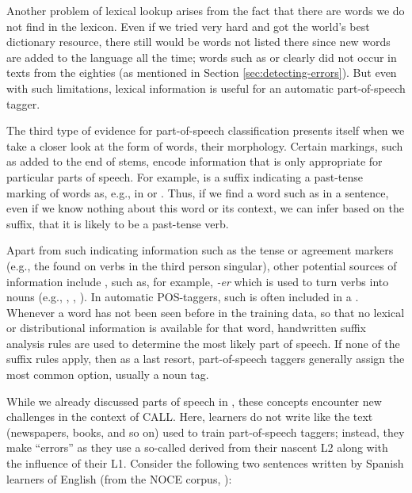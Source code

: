 Another problem of lexical lookup arises from the fact that there are
words we do not find in the lexicon. Even if we tried very hard and
got the world's best dictionary resource, there still would be words
not listed there since new words are added to the language all the
time; words such as  or
 clearly did not occur in texts from the eighties (as mentioned in Section \ref{sec:detecting-errors}). 
But even with such limitations, lexical information is useful for an automatic part-of-speech tagger.


The third type of evidence for part-of-speech classification presents itself when we take a closer look at the form
of words, their morphology.  Certain markings, such as
 added to the end of stems, encode information
that is only appropriate for particular parts of speech. For example,
 is a suffix indicating a past-tense marking of words
as, e.g., in  or . Thus, if we find a
word such as  in a sentence, even if we know
nothing about this word or its context, we can infer based on the
 suffix, that it is likely to be a past-tense verb. 

Apart from such 
indicating information such as the tense or agreement markers (e.g.,
the  found on verbs in the third person singular), other
potential sources of information include , such as, for example, \emph{-er}
which is used to turn verbs into nouns (e.g., ,
, ). In automatic
POS-taggers, such  is often included in a .
Whenever a word has not been seen before in the training data, so that
no lexical or distributional information is available for that word,
handwritten suffix analysis rules are used to determine the most likely
part of speech. If none of the suffix rules apply, then as a last resort, part-of-speech taggers generally assign the most
common option, usually a noun tag.

While we already discussed parts of speech in , these concepts encounter new challenges in the context of CALL.  Here, learners do not write like the text (newspapers, books, and so on) used to train part-of-speech taggers; instead, they make ``errors'' as they use a so-called  derived from their nascent L2 along with the influence of their L1.  Consider the
following two sentences written by Spanish learners of English (from
the NOCE corpus, \citealp{DiazNegrillo.Meurers.ea-09}):

